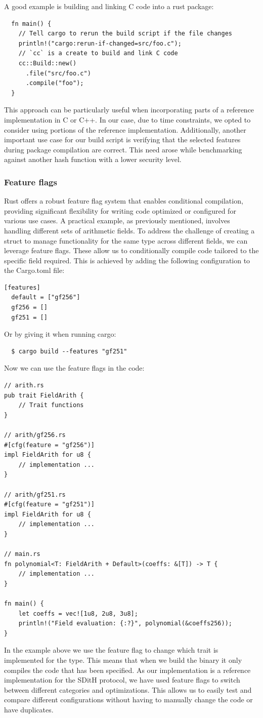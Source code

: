 \documentclass[11pt]{report}
\theoremstyle{definition}
\theoremstyle{plain}
\begin{document}
A good example is building and linking C code into a rust package:
\begin{verbatim}
  fn main() {
    // Tell cargo to rerun the build script if the file changes
    println!("cargo:rerun-if-changed=src/foo.c");
    // `cc` is a create to build and link C code
    cc::Build::new()
      .file("src/foo.c")
      .compile("foo");
  }
\end{verbatim}
This approach can be particularly useful when incorporating parts of a reference implementation in C or C++. In our case, due to time constraints, we opted to consider using portions of the reference implementation. Additionally, another important use case for our build script is verifying that the selected features during package compilation are correct. This need arose while benchmarking against another hash function with a lower security level.

\subsubsection{Feature flags}
Rust offers a robust feature flag system that enables conditional compilation, providing significant flexibility for writing code optimized or configured for various use cases.
A practical example, as previously mentioned, involves handling different sets of arithmetic fields. To address the challenge of creating a struct to manage functionality for the same type across different fields, we can leverage feature flags. These allow us to conditionally compile code tailored to the specific field required. This is achieved by adding the following configuration to the Cargo.toml file:
\begin{verbatim}
[features]
  default = ["gf256"]
  gf256 = []
  gf251 = []
\end{verbatim}
Or by giving it when running cargo:
\begin{verbatim}
  $ cargo build --features "gf251"
\end{verbatim}
Now we can use the feature flags in the code:
\begin{verbatim}
// arith.rs
pub trait FieldArith {
    // Trait functions
}

// arith/gf256.rs
#[cfg(feature = "gf256")]
impl FieldArith for u8 {
    // implementation ...
}

// arith/gf251.rs
#[cfg(feature = "gf251")]
impl FieldArith for u8 {
    // implementation ...
}

// main.rs
fn polynomial<T: FieldArith + Default>(coeffs: &[T]) -> T {
    // implementation ...
}

fn main() {
    let coeffs = vec![1u8, 2u8, 3u8];
    println!("Field evaluation: {:?}", polynomial(&coeffs256));
}
\end{verbatim}
In the example above we use the feature flag to change which trait is implemented for the  type. This means that when we build the binary it only compiles the code that has been specified.
As our implementation is a reference implementation for the SDitH protocol, we have used feature flags to switch between different categories and optimizations. This allows us to easily test and compare different configurations without having to manually change the code or have duplicates.
\end{document}
